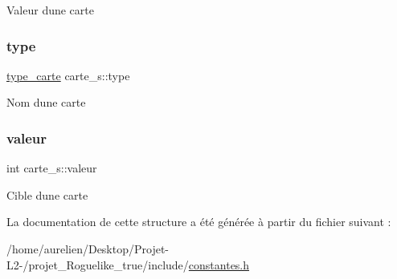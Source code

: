 Valeur d\textquotesingle{}une carte \mbox{\label{structcarte__s_aaf26c6876557066201a63c65c9ef8e5a}} 
\subsubsection{\texorpdfstring{type}{type}}
{\footnotesize\ttfamily \hyperlink{constantes_8h_a8fb27eb0b354a4f35787ef57ac90e0eb}{type\+\_\+carte} carte\+\_\+s\+::type}

Nom d\textquotesingle{}une carte \mbox{\label{structcarte__s_a432f48dcc3d414a0bdaeb77855060ee1}} 
\subsubsection{\texorpdfstring{valeur}{valeur}}
{\footnotesize\ttfamily int carte\+\_\+s\+::valeur}

Cible d\textquotesingle{}une carte 

La documentation de cette structure a été générée à partir du fichier suivant \+:\begin{DoxyCompactItemize}
\item 
/home/aurelien/\+Desktop/\+Projet-\/\+L2-\//projet\+\_\+\+Roguelike\+\_\+true/include/\hyperlink{constantes_8h}{constantes.\+h}\end{DoxyCompactItemize}
